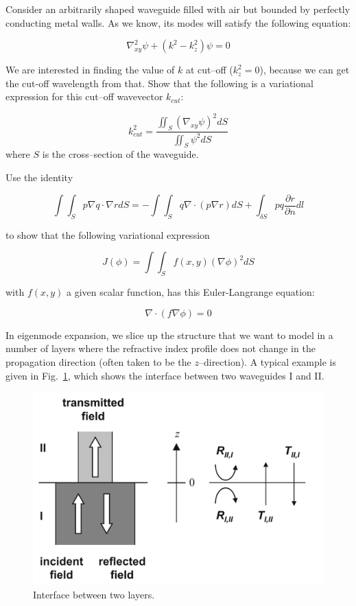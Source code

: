 \begin{exer}
Consider an arbitrarily shaped waveguide filled with air but bounded by perfectly conducting metal walls. As we know, its modes will satisfy the following equation:

$$ \nabla_{xy}^2 \psi + \left( k^2 - k_z^2 \right)\psi = 0 $$

We are interested in finding the value of $k$ at cut--off ($k_z^2=0$), because we can get the cut-off wavelength from that. Show that the following is a variational expression for this cut--off wavevector $k_{cut}$:

$$ k_{cut}^2 = \frac{\iint_S (\nabla_{xy} \psi)^2 dS}{\iint_S \psi^2 dS}$$
where $S$ is the cross--section of the waveguide.
\end{exer}


\begin{exer}

Use the identity

$$\int \int_S p \nabla q \cdot \nabla r dS= - \int \int_S q \nabla \cdot (p \nabla r) dS + \int_{\delta S} pq \frac{\partial r}{\partial n} dl$$

to show that the following variational expression

$$J(\phi)=\int \int_S f(x,y) (\nabla \phi)^2 dS$$

with $f(x,y)$ a given scalar function, has this Euler-Langrange equation:

$$\nabla \cdot \left( f \nabla \phi \right) = 0 $$

\end{exer}


\pagebreak



In eigenmode expansion, we slice up the structure that we want to model in a number of layers where the refractive index profile does not change in the propagation direction (often taken to be the $z$--direction). A typical example is given in Fig.~\ref{fig-interface}, which shows the interface between two waveguides I and II.

\begin{figure}
\centering
\includegraphics{numeric/figures/interface}
\caption{Interface between two layers.}
\label{fig-interface}
\end{figure}

